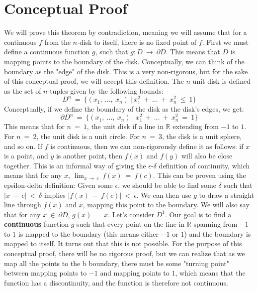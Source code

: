 \documentclass{article}
\begin{document}
\section{Conceptual Proof}
We will prove this theorem by contradiction, meaning we will assume that for a continuous $f$ from the $n$-disk to itself, there is no fixed point of $f$.
\newline\newline
First we must define a continuous function $g$, such that $g:D \ \rightarrow \ \partial D$. This means that $D$ is mapping points to the boundary of the disk. Conceptually, we can think of the boundary as the "edge" of the disk. This is a very non-rigorous, but for the sake of this conceptual proof, we will accept this definition. 
The $n$-unit disk is defined as the set of $n$-tuples given by the following bounds:
$$D^n \ = \ \{(x_1, \ ..., \ x_n) \ | \ x_1^2 \ + \ ... \ + \ x_n^2 \ \leq \ 1\}$$
Conceptually, if we define the boundary of the disk as the disk's edges, we get:
$$\partial D^n \ = \ \{(x_1, \ ..., \ x_n) \ | \ x_1^2 \ + \ ... \ + \ x_n^2 \ = \ 1\}$$
This means that for $n \ = \ 1$, the unit disk if a line in $\mathbb{R}$ extending from $-1$ to $1$. For $n \ = \ 2$, the unit disk is a unit circle. For $n \ = \ 3$, the disk is a unit sphere, and so on.
\newline\newline
If $f$ is continuous, then we can non-rigorously define it as follows: if $x$ is a point, and $y$ is another point, then $f(x)$ and $f(y)$ will also be close together. This is an informal way of giving the $\epsilon$-$\delta$ definition of continuity, which means that for any $x$, $\lim_{x \ \rightarrow \ c} \ f(x) \ = \ f(c)$. This can be proven using the epsilon-delta definition: Given some $\epsilon$, we should be able to find some $\delta$ such that $|x \ - \ c| \ < \ \delta$ implies $|f(x) \ - \ f(c)| \ < \ \epsilon$. We can then use $g$ to draw a straight line through $f(x)$ and $x$, mapping this point to the boundary. We will also say that for any $x \ \in \ \partial D$, $g(x) \ = \ x$.
\newline\newline
Let's consider $D^1$. Our goal is to find a \textbf{continuous} function $g$ such that every point on the line in $\mathbb{R}$ spanning from $-1$ to $1$ is mapped to the boundary (this means either $-1$ or $1$) and the boundary is mapped to itself. It turns out that this is not possible. For the purpose of this conceptual proof, there will be no rigorous proof, but we can realize that as we map all the points to the b boundary, there must be some "turning point" between mapping points to $-1$ and mapping points to $1$, which means that the function has a discontinuity, and the function is therefore not continuous.
\end{document}
